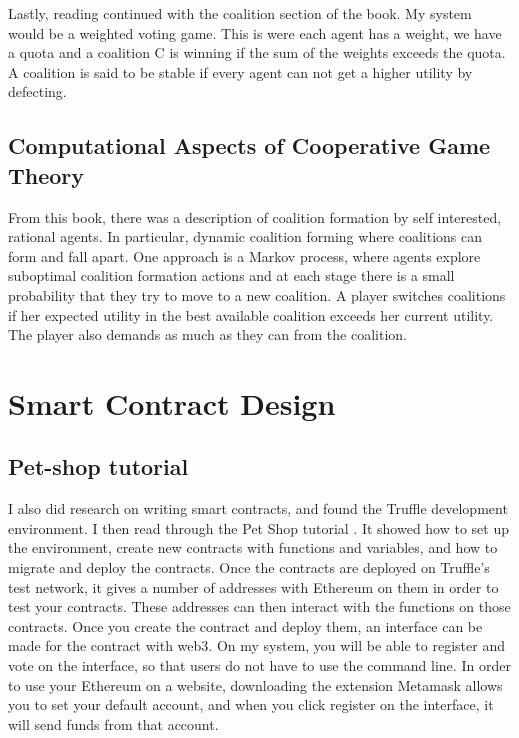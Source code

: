 Lastly, reading continued with the coalition section of the book. My system would be a weighted voting game. This is were each agent has a weight, we have a quota and a coalition C is winning if the sum of the weights exceeds the quota. A coalition is said to be stable if every agent can not get a higher utility by defecting.
\subsection*{Computational Aspects of Cooperative Game Theory \cite{Chalkiadakis:2012:pdflatex}}
From this book, there was a description of coalition formation by self interested, rational agents. In particular, dynamic coalition forming where coalitions can form and fall apart. One approach is a Markov process, where agents explore suboptimal coalition formation actions and at each stage there is a small probability that they try to move to a new coalition. A player switches coalitions if her expected utility in the best available coalition exceeds her current utility. The player also demands as much as they can from the coalition.
\section{Smart Contract Design} 
\subsection*{Pet-shop tutorial \cite{Truffle:2017:pdflatex}}
I also did research on writing smart contracts, and found the Truffle development environment. I then read through the Pet Shop tutorial . It showed how to set up the environment, create new contracts with functions and variables, and how to migrate and deploy the contracts. Once the contracts are deployed on Truffle's test network, it gives a number of addresses with Ethereum on them in order to test your contracts. These addresses can then interact with the functions on those contracts. Once you create the contract and deploy them, an interface can be made for the contract with web3. On my system, you will be able to register and vote on the interface, so that users do not have to use the command line. In order to use your Ethereum on a website, downloading the extension Metamask allows you to set your default account, and when you click register on the interface, it will send funds from that account.

